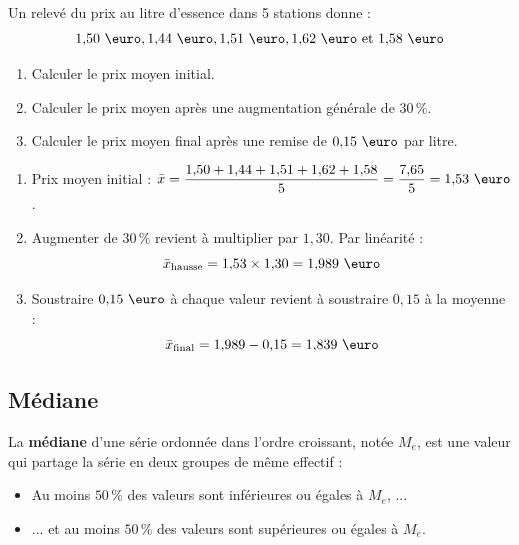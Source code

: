\begin{methode}
	Un relevé du prix au litre d'essence dans 5 stations donne :
	\[
		1{,}50\text{ \euro}, 1{,}44\text{ \euro}, 1{,}51\text{ \euro}, 1{,}62\text{ \euro} \text{ et } 1{,}58\text{ \euro}
	\]

	\begin{enumerate}
		\item Calculer le prix moyen initial.
		\item Calculer le prix moyen après une augmentation générale de $30\,\%$.
		\item Calculer le prix moyen final après une remise de $0{,}15\text{ \euro}$ par litre.
	\end{enumerate}

	\begin{correction}
		\nline
		\begin{enumerate}
			\item Prix moyen initial : $\bar{x} = \dfrac{1{,}50 + 1{,}44 + 1{,}51 + 1{,}62 + 1{,}58}{5} = \dfrac{7{,}65}{5} = 1{,}53\text{ \euro}$.
			\item Augmenter de $30\,\%$ revient à multiplier par $1{,}30$. Par linéarité :
			      \[
				      \bar{x}_{\text{hausse}} = 1{,}53 \times 1{,}30 = 1{,}989\text{ \euro}
			      \]

			\item Soustraire $0{,}15\text{ \euro}$ à chaque valeur revient à soustraire $0{,}15$ à la moyenne :
			      \[
				      \bar{x}_{\text{final}} = 1{,}989 - 0{,}15 = 1{,}839\text{ \euro}
			      \]
		\end{enumerate}
	\end{correction}
\end{methode}

\subsection{Médiane}

\begin{defin}[Médiane]
	La \textbf{médiane} d'une série ordonnée dans l'ordre croissant, notée $M_e$, est une valeur qui partage la série en deux groupes de même effectif :
	\begin{itemize}
		\item Au moins $50\,\%$ des valeurs sont inférieures ou égales à $M_e$, ...
		\item ... et au moins $50\,\%$ des valeurs sont supérieures ou égales à $M_e$.
	\end{itemize}
\end{defin}

